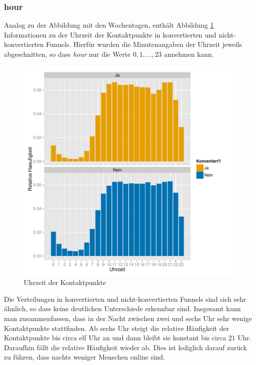 \subsubsection*{hour}
Analog zu der Abbildung mit den Wochentagen, enthält Abbildung \ref{hour} Informationen zu der Uhrzeit der Kontaktpunkte in konvertierten und nicht-konvertierten Funnels. Hierfür wurden die Minutenangaben der Uhrzeit jeweils abgeschnitten, so dass \textit{hour} nur die Werte $0,1,...,23$ annehmen kann.\\
\begin{figure}[H]
    \centering
    \includegraphics[scale=0.6]{hour.pdf}
    \caption{Uhrzeit der Kontaktpunkte}
    \label{hour}
\end{figure}
\noindent Die Verteilungen in konvertierten und nicht-konvertierten Funnels sind sich sehr ähnlich, so dass keine deutlichen Unterschiede erkennbar sind. Insgesamt kann man zusammenfassen, dass in der Nacht zwischen zwei und sechs Uhr sehr wenige Kontaktpunkte stattfinden. Ab sechs Uhr steigt die relative Häufigkeit der Kontaktpunkte bis circa elf Uhr an und dann bleibt sie konstant bis circa $21$ Uhr. Daraufhin fällt die relative Häufigkeit wieder ab. Dies ist lediglich darauf zurück zu führen, dass nachts weniger Menschen online sind.

